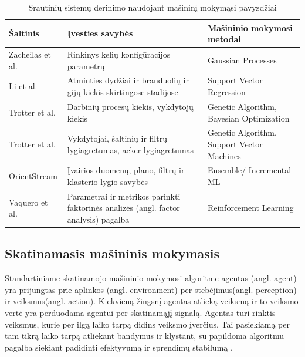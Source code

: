 \documentclass{VUMIFPSbakalaurinis}
\begin{document}
\begin{table}[H]
    \centering
    \caption{Srautinių sistemų derinimo naudojant mašininį mokymąsi pavyzdžiai \cite{herodotou2020survey}}
    \begin{tabular}{|l|p{}|p{}|}
    \hline
    Šaltinis                                        & Įvesties savybės                                                                    & Mašininio mokymosi metodai                 \\ \hline
    Zacheilas et al. \cite{zacheilas2015elastic}    & Rinkinys kelių konfigūracijos parametrų                                             & Gaussian Processes                         \\ \hline
    Li et al. \cite{li2016performance}              & Atminties dydžiai ir branduolių ir gijų kiekis skirtingose stadijose                & Support Vector Regression                  \\ \hline
    Trotter et al. \cite{Trotter2017Into}           & Darbinių procesų kiekis, vykdytojų kiekis                                           & Genetic Algorithm, Bayesian Optimization   \\ \hline
    Trotter et al. \cite{trotter2019forecasting}    & Vykdytojai, šaltinių ir filtrų lygiagretumas, acker lygiagretumas                   & Genetic Algorithm, Support Vector Machines \\ \hline
    OrientStream \cite{wang2017automating}          & Įvairios duomenų, plano, filtrų ir klasterio lygio savybės                          & Ensemble/ Incremental ML                    \\ \hline
    Vaquero et al. \cite{vaquero2018autotuning}     & Parametrai ir metrikos parinkti faktorinės analizės (angl. factor analysis) pagalba & Reinforcement Learning                     \\ \hline
    \end{tabular}
    \label{ml–in–stream}
\end{table}

\subsection{Skatinamasis mašininis mokymasis}
Standartiniame skatinamojo mašininio mokymosi algoritme agentas (angl. agent) yra prijungtas prie aplinkos (angl. environment) per stebėjimus(angl. perception) ir veiksmus(angl. action). Kiekvieną žingsnį agentas atlieką veiksmą ir to veiksmo vertė yra perduodama agentui per skatinamąjį signalą. Agentas turi rinktis veiksmus, kurie per ilgą laiko tarpą didins veiksmo įverčius. Tai pasiekiamą per tam tikrą laiko tarpą atliekant bandymus ir klystant, su papildoma algoritmu pagalba siekiant padidinti efektyvumą ir sprendimų stabilumą \cite{reinf}.     
\end{document}
